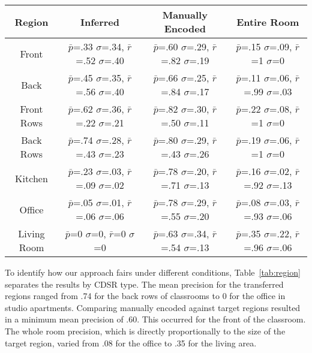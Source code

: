 \begin{table*}
	\center
\begin{tabular}{|c|c|c|c|}
\hline
Region & Inferred & Manually Encoded & Entire Room \\
\hline
Front & $\bar{p}$=.33 $\sigma$=.34, $\bar{r}$=.52 $\sigma$=.40 & $\bar{p}$=.60 $\sigma$=.29, $\bar{r}$=.82 $\sigma$=.19  & $\bar{p}$=.15 $\sigma$=.09, $\bar{r}$=1 $\sigma$=0  \\
\hline
Back & $\bar{p}$=.45 $\sigma$=.35, $\bar{r}$=.56 $\sigma$=.40 & $\bar{p}$=.66 $\sigma$=.25, $\bar{r}$=.84 $\sigma$=.17  & $\bar{p}$=.11 $\sigma$=.06, $\bar{r}$=.99 $\sigma$=.03  \\
\hline
Front Rows & $\bar{p}$=.62 $\sigma$=.36, $\bar{r}$=.22 $\sigma$=.21 & $\bar{p}$=.82 $\sigma$=.30, $\bar{r}$=.50 $\sigma$=.11  & $\bar{p}$=.22 $\sigma$=.08, $\bar{r}$=1 $\sigma$=0  \\
\hline
Back Rows & $\bar{p}$=.74 $\sigma$=.28, $\bar{r}$=.43 $\sigma$=.23 & $\bar{p}$=.80 $\sigma$=.29, $\bar{r}$=.43 $\sigma$=.26  & $\bar{p}$=.19 $\sigma$=.06, $\bar{r}$=1 $\sigma$=0  \\
\hline
Kitchen & $\bar{p}$=.23 $\sigma$=.03, $\bar{r}$=.09 $\sigma$=.02 & $\bar{p}$=.78 $\sigma$=.20, $\bar{r}$=.71 $\sigma$=.13  & $\bar{p}$=.16 $\sigma$=.02, $\bar{r}$=.92 $\sigma$=.13  \\
\hline
Office & $\bar{p}$=.05 $\sigma$=.01, $\bar{r}$=.06 $\sigma$=.06 & $\bar{p}$=.78 $\sigma$=.29, $\bar{r}$=.55 $\sigma$=.20  & $\bar{p}$=.08 $\sigma$=.03, $\bar{r}$=.93 $\sigma$=.06  \\
\hline
Living Room & $\bar{p}$=0 $\sigma$=0, $\bar{r}$=0 $\sigma$=0 & $\bar{p}$=.63 $\sigma$=.34, $\bar{r}$=.54 $\sigma$=.13  & $\bar{p}$=.35 $\sigma$=.22, $\bar{r}$=.96 $\sigma$=.06  \\
\hline
\end{tabular}
\caption{Performance by Region Type}
  \label{tab:region}	
\end{table*}


To identify how our approach fairs under different conditions, Table~\ref{tab:region} separates the results by CDSR type. The mean precision for the transferred regions ranged from .74 for the back rows of classrooms to 0 for the office in studio apartments. Comparing manually encoded against  target regions resulted in a minimum mean precision of .60. This occurred for the front of the classroom. The whole room precision, which is directly proportionally to the size of the target region, varied from .08 for the office to .35 for the living area.

